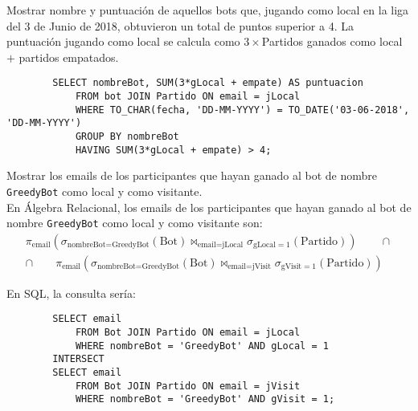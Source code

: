 \documentclass[12pt]{article}
\begin{document}
\begin{ejercicio}[SQL]
    Mostrar nombre y puntuación de aquellos bots que, jugando como local en la liga del 3 de Junio de 2018, obtuvieron un total de puntos superior a 4. La puntuación jugando como local se calcula como $3\times$Partidos ganados como local $+$ partidos empatados.
    \begin{verbatim}
        SELECT nombreBot, SUM(3*gLocal + empate) AS puntuacion
            FROM bot JOIN Partido ON email = jLocal
            WHERE TO_CHAR(fecha, 'DD-MM-YYYY') = TO_DATE('03-06-2018', 'DD-MM-YYYY')
            GROUP BY nombreBot
            HAVING SUM(3*gLocal + empate) > 4;
    \end{verbatim}
\end{ejercicio}

\begin{ejercicio}[AR y SQL]
    Mostrar los emails de los participantes que hayan ganado al bot de nombre \verb|GreedyBot| como local y como visitante.\\

    En Álgebra Relacional, los emails de los participantes que hayan ganado al bot de nombre \verb|GreedyBot| como local y como visitante son:
    \begin{multline*}
        \pi_{\text{email}}\left(\sigma_{\text{nombreBot}=\text{GreedyBot}}(\text{Bot})\bowtie_{\text{email}=\text{jLocal}}\sigma_{\text{gLocal}=1}(\text{Partido})\right)
        \qquad \cap\\
        \cap\qquad \pi_{\text{email}}\left(\sigma_{\text{nombreBot}=\text{GreedyBot}}(\text{Bot})\bowtie_{\text{email}=\text{jVisit}}\sigma_{\text{gVisit}=1}(\text{Partido})\right)
    \end{multline*}

    En SQL, la consulta sería:
    \begin{verbatim}
        SELECT email
            FROM Bot JOIN Partido ON email = jLocal
            WHERE nombreBot = 'GreedyBot' AND gLocal = 1
        INTERSECT
        SELECT email
            FROM Bot JOIN Partido ON email = jVisit
            WHERE nombreBot = 'GreedyBot' AND gVisit = 1;
    \end{verbatim}
\end{ejercicio}
\end{document}
